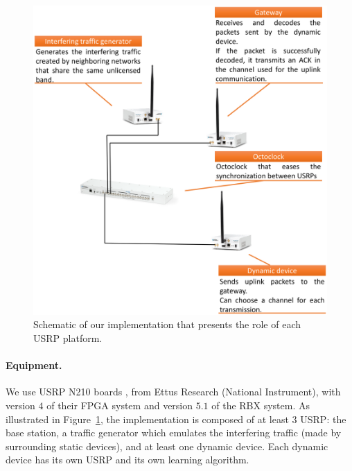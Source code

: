 \begin{figure}[!b]
    \centering
    \includegraphics[width=0.75\linewidth]{our-demo.eps}
    \caption{Schematic of our implementation that presents the role of each USRP platform.}
    \label{fig:42:our_demo}
\end{figure}


\paragraph{Equipment.}
We use USRP N210 boards \cite{USRPDocumentation}, from Ettus Research (National Instrument),
with version $4$ of their FPGA system and version $5.1$ of the RBX system.
As illustrated in Figure~\ref{fig:42:our_demo}, the implementation is composed of at least $3$ USRP:
the base station,
a traffic generator which emulates the interfering traffic (made by surrounding static devices),
and at least one dynamic device.
Each dynamic device has its own USRP and its own learning algorithm.


